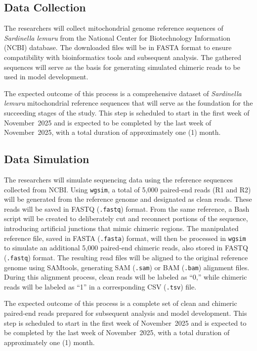 \subsection{Data Collection}

The researchers will collect mitochondrial genome reference sequences of \textit{Sardinella lemuru} from the National Center for Biotechnology Information (NCBI) database. The downloaded files will be in FASTA format to ensure compatibility with bioinformatics tools and subsequent analysis. The gathered sequences will serve as the basis for generating simulated chimeric reads to be used in model development.

The expected outcome of this process is a comprehensive dataset of \textit{Sardinella lemuru} mitochondrial reference sequences that will serve as the foundation for the succeeding stages of the study. This step is scheduled to start in the first week of November~2025 and is expected to be completed by the last week of November~2025, with a total duration of approximately one (1) month.

\subsection{Data Simulation}

The researchers will simulate sequencing data using the reference sequences collected from NCBI. Using \texttt{wgsim}, a total of 5{,}000 paired-end reads (R1 and R2) will be generated from the reference genome and designated as clean reads. These reads will be saved in FASTQ (\texttt{.fastq}) format. From the same reference, a Bash script will be created to deliberately cut and reconnect portions of the sequence, introducing artificial junctions that mimic chimeric regions. The manipulated reference file, saved in FASTA (\texttt{.fasta}) format, will then be processed in \texttt{wgsim} to simulate an additional 5{,}000 paired-end chimeric reads, also stored in FASTQ (\texttt{.fastq}) format. The resulting read files will be aligned to the original reference genome using SAMtools, generating SAM (\texttt{.sam}) or BAM (\texttt{.bam}) alignment files. During this alignment process, clean reads will be labeled as ``0,'' while chimeric reads will be labeled as ``1'' in a corresponding CSV (\texttt{.tsv}) file.

The expected outcome of this process is a complete set of clean and chimeric paired-end reads prepared for subsequent analysis and model development. This step is scheduled to start in the first week of November~2025 and is expected to be completed by the last week of November~2025, with a total duration of approximately one (1) month.

